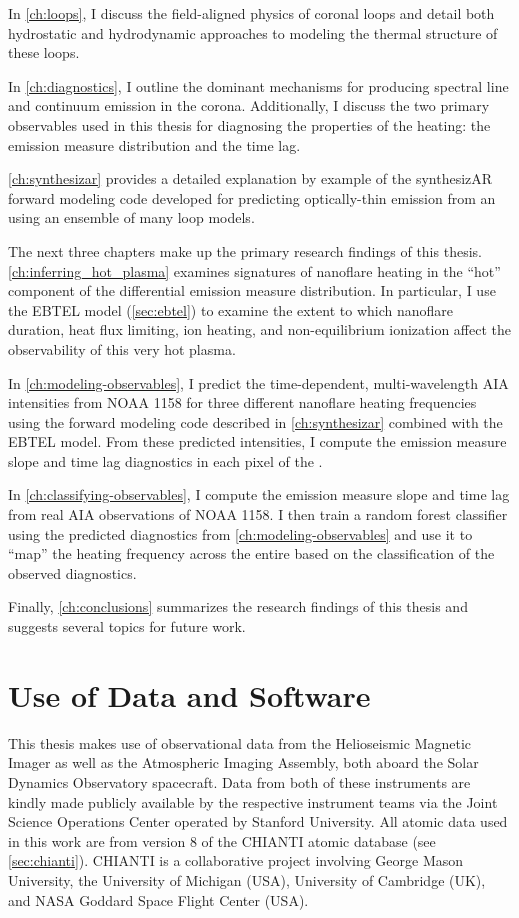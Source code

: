 In \autoref{ch:loops}, I discuss the field-aligned physics of coronal loops and detail both hydrostatic and hydrodynamic approaches to modeling the thermal structure of these loops.

In \autoref{ch:diagnostics}, I outline the dominant mechanisms for producing spectral line and continuum emission in the corona. Additionally, I discuss the two primary observables used in this thesis for diagnosing the properties of the heating: the emission measure distribution and the time lag.

\autoref{ch:synthesizar} provides a detailed explanation by example of the synthesizAR forward modeling code developed for predicting optically-thin emission from an \AR{} using an ensemble of many loop models.

The next three chapters make up the primary research findings of this thesis. \autoref{ch:inferring_hot_plasma} examines signatures of nanoflare heating in the ``hot'' component of the differential emission measure distribution. In particular, I use the EBTEL model (\autoref{sec:ebtel}) to examine the extent to which nanoflare duration, heat flux limiting, ion heating, and non-equilibrium ionization affect the observability of this very hot plasma.

In \autoref{ch:modeling-observables}, I predict the time-dependent, multi-wavelength AIA intensities from \AR{} NOAA 1158 for three different nanoflare heating frequencies using the forward modeling code described in \autoref{ch:synthesizar} combined with the EBTEL model. From these predicted intensities, I compute the emission measure slope and time lag diagnostics in each pixel of the \AR{}.

In \autoref{ch:classifying-observables}, I compute the emission measure slope and time lag from real AIA observations of \AR{} NOAA 1158. I then train a random forest classifier using the predicted diagnostics from \autoref{ch:modeling-observables} and use it to ``map'' the heating frequency across the entire \AR{} based on the classification of the observed diagnostics.

Finally, \autoref{ch:conclusions} summarizes the research findings of this thesis and suggests several topics for future work.

\section{Use of Data and Software}\label{sec:software-data}

This thesis makes use of observational data from the Helioseismic Magnetic Imager as well as the Atmospheric Imaging Assembly, both aboard the Solar Dynamics Observatory spacecraft. Data from both of these instruments are kindly made publicly available by the respective instrument teams via the Joint Science Operations Center \citep[JSOC,][]{couvidat_observables_2016} operated by Stanford University. All atomic data used in this work are from version 8 of the CHIANTI atomic database (see \autoref{sec:chianti}). CHIANTI is a collaborative project involving George Mason University, the University of Michigan (USA), University of Cambridge (UK), and NASA Goddard Space Flight Center (USA).


